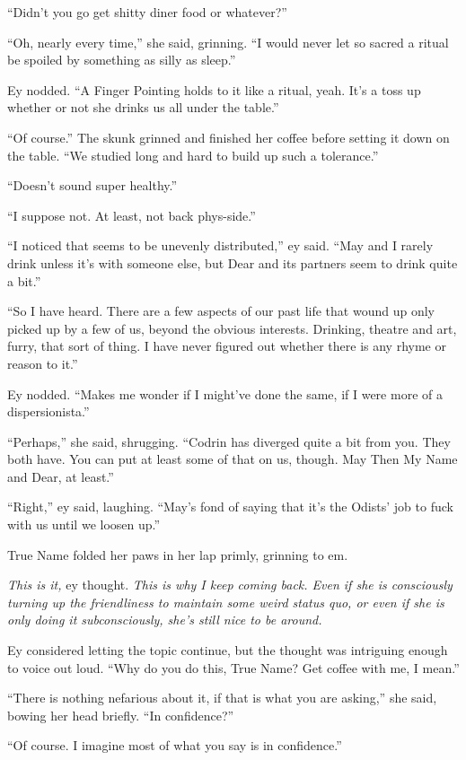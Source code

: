 ``Didn't you go get shitty diner food or whatever?''

``Oh, nearly every time,'' she said, grinning. ``I would never let so sacred a ritual be spoiled by something as silly as sleep.''

Ey nodded. ``A Finger Pointing holds to it like a ritual, yeah. It's a toss up whether or not she drinks us all under the table.''

``Of course.'' The skunk grinned and finished her coffee before setting it down on the table. ``We studied long and hard to build up such a tolerance.''

``Doesn't sound super healthy.''

``I suppose not. At least, not back phys-side.''

``I noticed that seems to be unevenly distributed,'' ey said. ``May and I rarely drink unless it's with someone else, but Dear and its partners seem to drink quite a bit.''

``So I have heard. There are a few aspects of our past life that wound up only picked up by a few of us, beyond the obvious interests. Drinking, theatre and art, furry, that sort of thing. I have never figured out whether there is any rhyme or reason to it.''

Ey nodded. ``Makes me wonder if I might've done the same, if I were more of a dispersionista.''

``Perhaps,'' she said, shrugging. ``Codrin has diverged quite a bit from you. They both have. You can put at least some of that on us, though. May Then My Name and Dear, at least.''

``Right,'' ey said, laughing. ``May's fond of saying that it's the Odists' job to fuck with us until we loosen up.''

True Name folded her paws in her lap primly, grinning to em.

\emph{This is it,} ey thought. \emph{This is why I keep coming back. Even if she is consciously turning up the friendliness to maintain some weird status quo, or even if she is only doing it subconsciously, she's still nice to be around.}

Ey considered letting the topic continue, but the thought was intriguing enough to voice out loud. ``Why do you do this, True Name? Get coffee with me, I mean.''

``There is nothing nefarious about it, if that is what you are asking,'' she said, bowing her head briefly. ``In confidence?''

``Of course. I imagine most of what you say is in confidence.''

